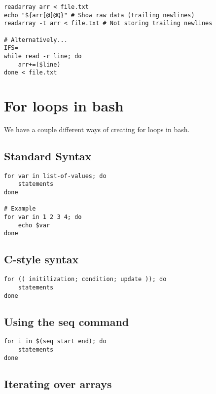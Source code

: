 \documentclass{report}
\begin{document}
    \begin{verbatim}
readarray arr < file.txt
echo "${arr[@]@Q}" # Show raw data (trailing newlines)
readarray -t arr < file.txt # Not storing trailing newlines

# Alternatively...
IFS=
while read -r line; do
    arr+=($line)
done < file.txt
    \end{verbatim}
    \bigbreak \noindent
    
    
    \pagebreak \bigbreak \noindent 
    \section{\LARGE For loops in bash}
    \bigbreak \noindent 
    We have a couple different ways of creating for loops in bash.
    \bigbreak \noindent 
    \subsection{Standard Syntax}
    \smallbreak \noindent
    
    \begin{verbatim}
for var in list-of-values; do
    statements
done

# Example
for var in 1 2 3 4; do
    echo $var
done
    \end{verbatim}
    \bigbreak \noindent
    

    \bigbreak \noindent 
    \subsection{C-style syntax}
    \smallbreak \noindent
    
    \begin{verbatim}
for (( initilization; condition; update )); do 
    statements
done
    \end{verbatim}
    \bigbreak \noindent
    
    \bigbreak \noindent 
    \subsection{Using the seq command}
    \smallbreak \noindent
    
    \begin{verbatim}
for i in $(seq start end); do
    statements
done
    \end{verbatim}
    \bigbreak \noindent
    

    \bigbreak \noindent 
    \subsection{Iterating over arrays}
    \smallbreak \noindent
    
\end{document}
